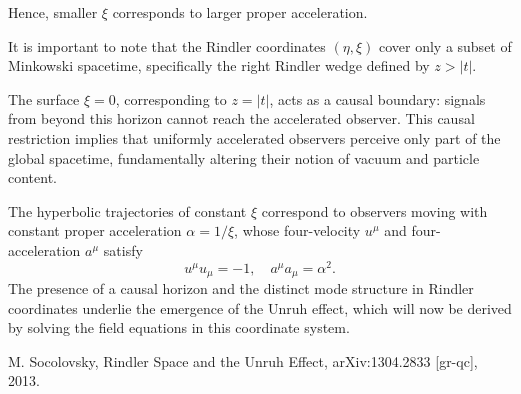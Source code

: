 \begin{technical}
Hence, smaller $\xi$ corresponds to larger proper acceleration.

It is important to note that the Rindler coordinates $(\eta, \xi)$ cover only a subset of Minkowski spacetime, specifically the right Rindler wedge defined by $z > |t|$.

The surface $\xi = 0$, corresponding to $z = |t|$, acts as a causal boundary: signals from beyond this horizon cannot reach the accelerated observer. This causal restriction implies that uniformly accelerated observers perceive only part of the global spacetime, fundamentally altering their notion of vacuum and particle content.

The hyperbolic trajectories of constant $\xi$ correspond to observers moving with constant proper acceleration $\alpha = 1/\xi$, whose four-velocity $u^\mu$ and four-acceleration $a^\mu$ satisfy
\[
u^\mu u_\mu = -1, \quad a^\mu a_\mu = \alpha^2.
\]
The presence of a causal horizon and the distinct mode structure in Rindler coordinates underlie the emergence of the Unruh effect, which will now be derived by solving the field equations in this coordinate system.

\techref
{\footnotesize
M. Socolovsky, Rindler Space and the Unruh Effect, arXiv:1304.2833 [gr-qc], 2013.
}
\end{technical}